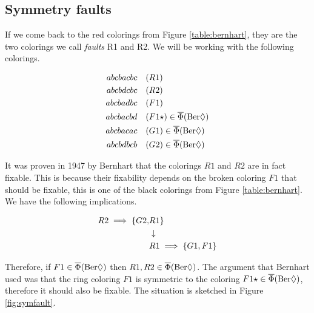 \subsection{Symmetry faults}

If we come back to the red colorings from Figure \ref{table:bernhart}, they are the two colorings we call \textit{faults} R1 and R2. We will be working with the following colorings.

\begin{equation}
    \begin{aligned}
        abcbacbc &\quad (R1)\\
        abcbdcbc &\quad (R2)\\
        abcbadbc &\quad (F1)\\
        abcbacbd &\quad (F1\star)  \in \overline{\Phi}(\text{Ber}\Diamond)\\
        abcbacac &\quad (G1) \in \overline{\Phi}(\text{Ber}\Diamond) \\
        abcbdbcb &\quad (G2) \in \overline{\Phi}(\text{Ber}\Diamond) \\
    \end{aligned}
\end{equation}

It was proven in 1947 by Bernhart \cite{bernhart} that the colorings $R1$ and $R2$ are in fact fixable. This is because their fixability depends on the broken coloring $F1$ that should be fixable, this is one of the black colorings from Figure \ref{table:bernhart}. We have the following implications.

\begin{equation}
    \begin{aligned}
    R2 \implies \{ G2, &R1 \} \\
    &\downarrow \\
    &R1 \implies \{ G1, F1 \} \\
    \end{aligned}
\end{equation}

Therefore, if $F1 \in \overline{\Phi}(\text{Ber}\Diamond)$ then $R1, R2 \in \overline{\Phi}(\text{Ber}\Diamond)$. The argument that Bernhart used was that the ring coloring $F1$ is symmetric to the coloring $F1\star \in \overline{\Phi}(\text{Ber}\Diamond)$, therefore it should also be fixable. The situation is sketched in Figure \ref{fig:symfault}.

